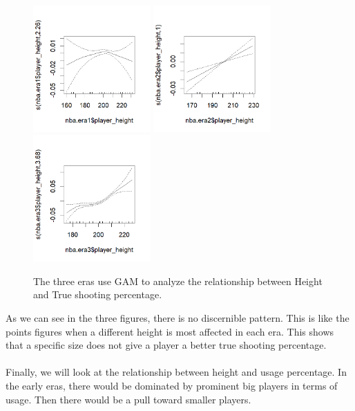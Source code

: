 \documentclass[11pt,letterpaper]{amsart}
\begin{document}
\begin{figure}[H] 
\includegraphics[width=0.4\textwidth]{Era1ts}\hspace{1cm}
\includegraphics[width=0.4\textwidth]{Era2ts}\hspace{1cm}
\includegraphics[width=0.4\textwidth]{Era3ts}\hspace{1cm}
\caption{The three eras use GAM to analyze the relationship between Height and True shooting percentage. \label{fig4}}
\end{figure} \leavevmode

\indent As we can see in the three figures, there is no discernible pattern. This is like the points figures when a different height is most affected in each era. This shows that a specific size does not give a player a better true shooting percentage.\\\\
\indent Finally, we will look at the relationship between height and usage percentage. In the early eras, there would be dominated by prominent big players in terms of usage. Then there would be a pull toward smaller players.
\end{document}
